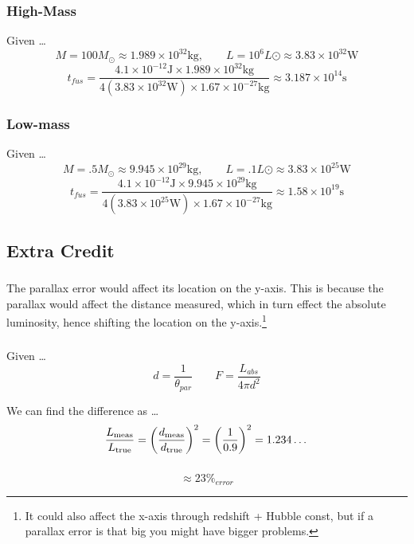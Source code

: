 \documentclass{article}
\begin{document}
\subsubsection{High-Mass}
Given \dots
\[M = 100 M_\odot \approx 1.989 \times 10^{32} \text{kg}, \qquad  L = 10^6 L\odot \approx 3.83 \times 10^{32} \text{W}\]
\[t_{fus} = \frac{4.1 \times 10^{-12} \text{J} \times 1.989 \times 10^{32} \text{kg}}{4(3.83 \times 10^{32} \text{W})\times 1.67 \times 10^{-27} \text{kg}} \approx 3.187 \times 10^{14} \text{s}\]
\subsubsection{Low-mass}
Given \dots
\[M = .5 M_\odot \approx 9.945 \times 10^{29} \text{kg}, \qquad  L = .1 L\odot \approx 3.83 \times 10^{25} \text{W}\]
\[t_{fus} = \frac{4.1 \times 10^{-12} \text{J} \times 9.945 \times 10^{29} \text{kg}}{4(3.83 \times 10^{25} \text{W})\times 1.67 \times 10^{-27} \text{kg}} \approx 1.58 \times 10^{19} \text{s}\]
\subsection{}

\subsection{Extra Credit}
\subsubsection{}
The parallax error would affect its location on the y-axis. This is because the parallax would affect the distance measured, which in turn effect the absolute luminosity, hence shifting the location on the y-axis.\footnote{It could also affect the x-axis through redshift + Hubble const, but if a parallax error is that big you might have bigger problems.}

\subsubsection{}
Given \dots
\[d = \frac{1}{\theta_{par}} \qquad F = \frac{L_{abs}}{4\pi d^2} \]

We can find the difference as \dots
\[
\frac{L_{\rm meas}}{L_{\rm true}}
= \left(\frac{d_{\rm meas}}{d_{\rm true}}\right)^2
= \left(\frac{1}{0.9}\right)^2
= 1.234\dots
\]

\subsubsection{}
\[\approx 23\%_{error}\]
\end{document}
